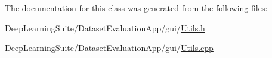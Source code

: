 The documentation for this class was generated from the following files\+:\begin{DoxyCompactItemize}
\item 
Deep\+Learning\+Suite/\+Dataset\+Evaluation\+App/gui/\hyperlink{_utils_8h}{Utils.\+h}\item 
Deep\+Learning\+Suite/\+Dataset\+Evaluation\+App/gui/\hyperlink{_utils_8cpp}{Utils.\+cpp}\end{DoxyCompactItemize}
